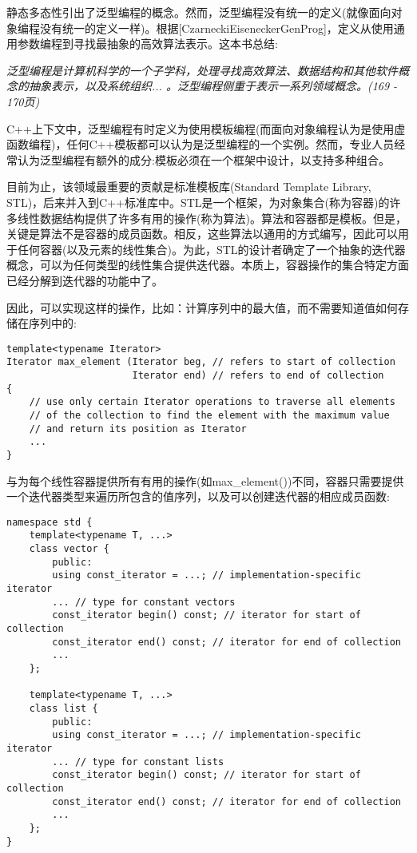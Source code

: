 静态多态性引出了泛型编程的概念。然而，泛型编程没有统一的定义(就像面向对象编程没有统一的定义一样)。根据[CzarneckiEiseneckerGenProg]，定义从使用通用参数编程到寻找最抽象的高效算法表示。这本书总结:

\textit{泛型编程是计算机科学的一个子学科，处理寻找高效算法、数据结构和其他软件概念的抽象表示，以及系统组织... 。泛型编程侧重于表示一系列领域概念。(169 - 170页)}

C++上下文中，泛型编程有时定义为使用模板编程(而面向对象编程认为是使用虚函数编程)，任何C++模板都可以认为是泛型编程的一个实例。然而，专业人员经常认为泛型编程有额外的成分:模板必须在一个框架中设计，以支持多种组合。

目前为止，该领域最重要的贡献是标准模板库(Standard Template Library, STL)，后来并入到C++标准库中。STL是一个框架，为对象集合(称为容器)的许多线性数据结构提供了许多有用的操作(称为算法)。算法和容器都是模板。但是，关键是算法不是容器的成员函数。相反，这些算法以通用的方式编写，因此可以用于任何容器(以及元素的线性集合)。为此，STL的设计者确定了一个抽象的迭代器概念，可以为任何类型的线性集合提供迭代器。本质上，容器操作的集合特定方面已经分解到迭代器的功能中了。

因此，可以实现这样的操作，比如：计算序列中的最大值，而不需要知道值如何存储在序列中的:

\begin{lstlisting}[style=styleCXX]
template<typename Iterator>
Iterator max_element (Iterator beg, // refers to start of collection
					  Iterator end) // refers to end of collection
{
	// use only certain Iterator operations to traverse all elements
	// of the collection to find the element with the maximum value
	// and return its position as Iterator
	...
}
\end{lstlisting}

与为每个线性容器提供所有有用的操作(如max\_element())不同，容器只需要提供一个迭代器类型来遍历所包含的值序列，以及可以创建迭代器的相应成员函数:

\begin{lstlisting}[style=styleCXX]
namespace std {
	template<typename T, ...>
	class vector {
		public:
		using const_iterator = ...; // implementation-specific iterator
		... // type for constant vectors
		const_iterator begin() const; // iterator for start of collection
		const_iterator end() const; // iterator for end of collection
		...
	};

	template<typename T, ...>
	class list {
		public:
		using const_iterator = ...; // implementation-specific iterator
		... // type for constant lists
		const_iterator begin() const; // iterator for start of collection
		const_iterator end() const; // iterator for end of collection
		...
	};
}
\end{lstlisting}

